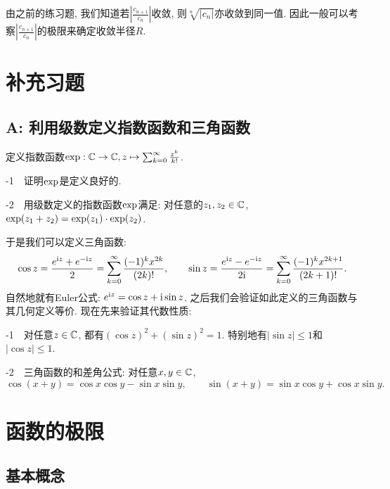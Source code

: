 由之前的练习题, 我们知道若$|\frac{c_{n+1}}{c_n} |$收敛, 则$\sqrt[n]{|c_n|}$亦收敛到同一值. 因此一般可以考察$|\frac{c_{n+1}}{c_n} |$的极限来确定收敛半径$R$. 




\newpage
\section*{补充习题} \label{sec:ex3.2}

\subsection*{A: 利用级数定义指数函数和三角函数}

定义指数函数${\rm exp} : \mathbb{C} \to \mathbb{C}, z \mapsto \sum_{k=0}^{\infty} \frac{z^k}{k!}$. 
\vspace{1em}

-1~~证明$\rm exp$是定义良好的. 
\vspace{1em}

-2~~用级数定义的指数函数$\rm \exp$满足: 对任意的$z_1,z_2 \in \mathbb{C}$, ${\rm exp}(z_1+z_2) = {\rm exp} (z_1) \cdot {\rm exp} (z_2)$. 
\vspace{1em}

于是我们可以定义三角函数: $$\cos z = \frac{e^{\mathrm{i} z}+e^{-\mathrm{i} z}}{2}= \sum_{k=0}^{\infty} \frac{(-1)^kx^{2k}}{(2k)!},\qquad \sin z = \frac{e^{\mathrm{i} z} - e^{-\mathrm{i} z}}{2\mathrm{i}} = \sum_{k=0}^{\infty} \frac{(-1)^kx^{2k+1}}{(2k+1)!}. $$
自然地就有Euler公式: $e^{\mathrm{i} z}=\cos z+\mathrm{i} \sin z$. 之后我们会验证如此定义的三角函数与其几何定义等价. 现在先来验证其代数性质: 
\vspace{1em}

-1~~对任意$z \in \mathbb{C}$, 都有$(\cos z)^2+(\sin z)^2=1$. 特别地有$|\sin z| \leq 1$和$|\cos z| \leq 1$. 

-2~~三角函数的和差角公式: 对任意$x,y \in \mathbb{C}$, $$\cos(x+y) = \cos x \cos y - \sin x \sin y,\qquad \sin(x+y) = \sin x \cos y + \cos x \sin y.$$

\newpage
\section{函数的极限}

\subsection{基本概念}

